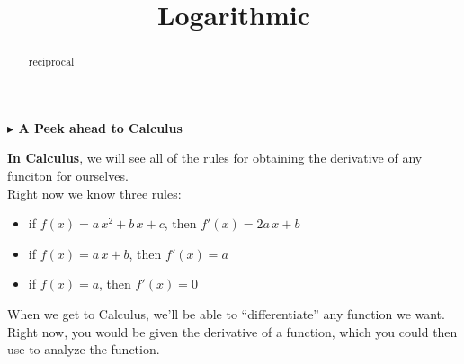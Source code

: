 \documentclass{ximera}
\title{Logarithmic}
\begin{document}
\begin{abstract}
reciprocal
\end{abstract}
\maketitle












\textbf{\textcolor{red!70!darkgray}{$\blacktriangleright$ A Peek ahead to Calculus}}





\textbf{\textcolor{blue!55!black}{In Calculus}}, we will see all of the rules for obtaining the derivative of any funciton for ourselves. \\

Right now we know three rules:

\begin{itemize}
	\item if $f(x) = a \, x^2 + b \, x + c$, then $f'(x) = 2a \, x + b$
	\item if $f(x) = a \, x + b$, then $f'(x) = a$
	\item if $f(x) = a$, then $f'(x) = 0$
\end{itemize}



When we get to Calculus, we'll be able to ``differentiate'' any function we want. \\

Right now, you would be given the derivative of a function, which you could then use to analyze the function. \\
\end{document}
